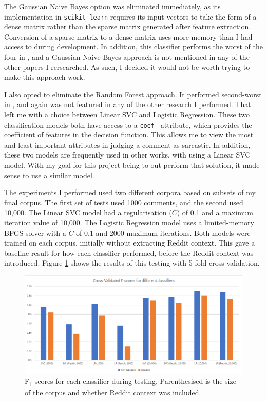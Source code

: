 \documentclass[a4paper,12pt]{article}
\begin{document}
The Gaussian Naive Bayes option was eliminated immediately, as its implementation in \texttt{scikit-learn} requires its input vectors to take the form of a dense matrix rather than the sparse matrix generated after feature extraction. Conversion of a sparse matrix to a dense matrix uses more memory than I had access to during development. In addition, this classifier performs the worst of the four in \cite{singhSarcasmDetectionStep2019}, and a Gaussian Naive Bayes approach is not mentioned in any of the other papers I rersearched. As such, I decided it would not be worth trying to make this approach work.

I also opted to eliminate the Random Forest approach. It performed second-worst in \cite{singhSarcasmDetectionStep2019}, and again was not featured in any of the other research I performed. That left me with a choice between Linear SVC and Logistic Regression. These two classification models both have access to a \texttt{coef\_} attribute, which provides the coefficient of features in the decision function. This allows me to view the most and least important attributes in judging a comment as sarcastic. In addition, these two models are frequently used in other works, with \cite{clicheSarcasmDetector2014} using a Linear SVC model. With my goal for this project being to out-perform that solution, it made sense to use a similar model.

The experiments I performed used two different corpora based on subsets of my final corpus. The first set of tests used 1000 comments, and the second used 10,000. The Linear SVC model had a regularisation ($C$) of 0.1 and a maximum iteration value of 10,000. The Logistic Regression model uses a limited-memory BFGS solver with a $C$ of 0.1 and 2000 maximum iterations. Both models were trained on each corpus, initially without extracting Reddit context. This gave a baseline result for how each classifier performed, before the Reddit context was introduced. Figure \ref{fig:cmd5} shows the results of this testing with 5-fold cross-validation.

\begin{figure}[h!]
\includegraphics[width=\linewidth]{Figures/classification_report.png}
\caption{F\textsubscript{1} scores for each classifier during testing. Parenthesised is the size of the corpus and whether Reddit context was included.}
\label{fig:cmd5}
\end{figure}
\end{document}
